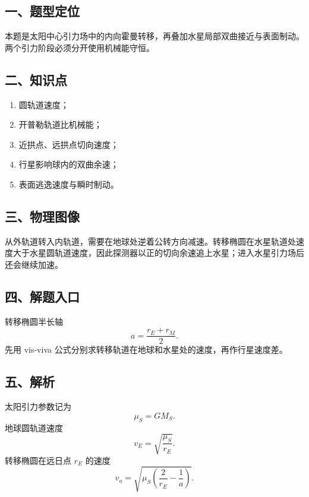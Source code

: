 \documentclass[12pt,a4paper,UTF8]{ctexart}
\newcommand{\tightlist}{\setlength{\itemsep}{0pt}\setlength{\parskip}{0pt}}
\begin{document}
\subsection{一、题型定位}\label{ux4e00ux9898ux578bux5b9aux4f4d-7}

本题是太阳中心引力场中的内向霍曼转移，再叠加水星局部双曲接近与表面制动。两个引力阶段必须分开使用机械能守恒。

\subsection{二、知识点}\label{ux4e8cux77e5ux8bc6ux70b9-7}

\begin{enumerate}
\def\labelenumi{\arabic{enumi}.}
\tightlist
\item
  圆轨道速度；
\item
  开普勒轨道比机械能；
\item
  近拱点、远拱点切向速度；
\item
  行星影响球内的双曲余速；
\item
  表面逃逸速度与瞬时制动。
\end{enumerate}

\subsection{三、物理图像}\label{ux4e09ux7269ux7406ux56feux50cf-7}

从外轨道转入内轨道，需要在地球处逆着公转方向减速。转移椭圆在水星轨道处速度大于水星圆轨道速度，因此探测器以正的切向余速追上水星；进入水星引力场后还会继续加速。

\subsection{四、解题入口}\label{ux56dbux89e3ux9898ux5165ux53e3-7}

转移椭圆半长轴 \[
a=\frac{r_E+r_M}{2}.
\] 先用 vis-viva
公式分别求转移轨道在地球和水星处的速度，再作行星速度差。

\subsection{五、解析}\label{ux4e94ux89e3ux6790-7}

太阳引力参数记为 \[
\mu_S=GM_S. \tag{1}
\] 地球圆轨道速度 \[
v_E=\sqrt{\frac{\mu_S}{r_E}}. \tag{2}
\] 转移椭圆在远日点 \(r_E\) 的速度 \[
v_a=\sqrt{\mu_S\left(\frac2{r_E}-\frac1a\right)}. \tag{3}
\]
\end{document}
